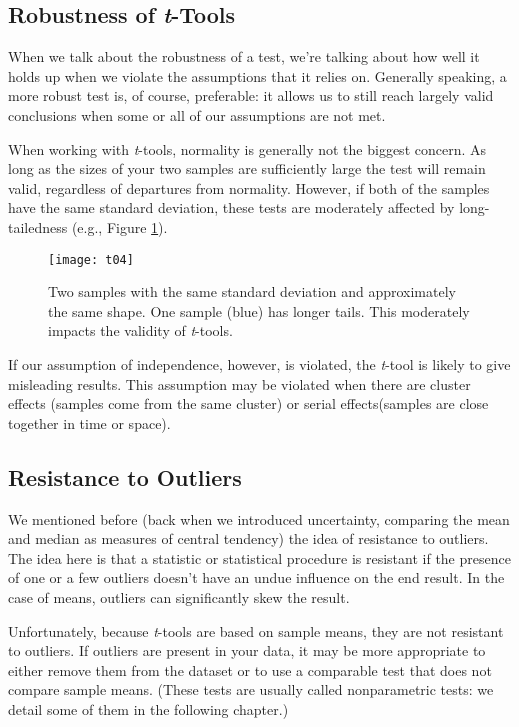 \subsection{Robustness of \textit{t}-Tools}

When we talk about the robustness of a test, we're talking about how well it holds up when we violate the assumptions that it relies on. Generally speaking, a more robust test is, of course, preferable: it allows us to still reach largely valid conclusions when some or all of our assumptions are not met.

When working with \textit{t}-tools, normality is generally not the biggest concern. As long as the sizes of your two samples are sufficiently large the test will remain valid, regardless of departures from normality. However, if both of the samples have the same standard deviation, these tests are moderately affected by long-tailedness (e.g., Figure \ref{fig:t04}).

\begin{figure}[h]
\texttt{[image: t04]}
\caption{Two samples with the same standard deviation and approximately the same shape. One sample (blue) has longer tails. This moderately impacts the validity of \textit{t}-tools.}
\label{fig:t04}
\end{figure} 

If our assumption of independence, however, is violated, the \textit{t}-tool is likely to give misleading results. This assumption may be violated when there are cluster effects (samples come from the same cluster) or serial effects(samples are close together in time or space). 

\subsection{Resistance to Outliers}

We mentioned before (back when we introduced uncertainty, comparing the mean and median as measures of central tendency) the idea of resistance to outliers. The idea here is that a statistic or statistical procedure is resistant if the presence of one or a few outliers doesn't have an undue influence on the end result. In the case of means, outliers can significantly skew the result.

Unfortunately, because \textit{t}-tools are based on sample means, they are not resistant to outliers. If outliers are present in your data, it may be more appropriate to either remove them from the dataset or to use a comparable test that does not compare sample means. (These tests are usually called nonparametric tests: we detail some of them in the following chapter.)

